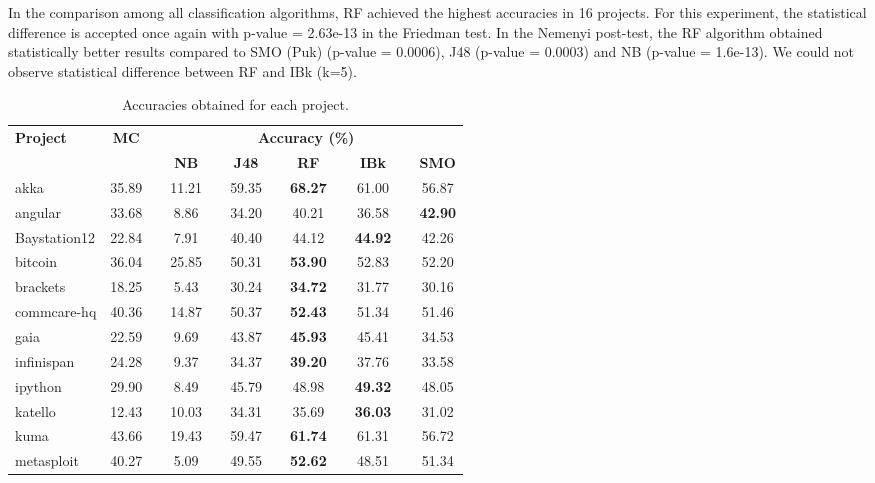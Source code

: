 \documentclass{sig-alternate}
\begin{document}
In the comparison among all classification algorithms, RF achieved the highest accuracies in 16 projects. For this experiment, the statistical difference is accepted once again with p-value = 2.63e-13 in the Friedman test. In the Nemenyi post-test, the RF algorithm obtained statistically better results compared to SMO (Puk) (p-value = 0.0006), J48 (p-value = 0.0003) and NB (p-value = 1.6e-13). We could not observe statistical difference between RF and IBk (k=5).
\begin{table}[t]
\vspace{-0.215cm}
\caption{Accuracies obtained for each project.}\label{tab:Table 3}
\begin{tabular}{@{}lc@{} p{0.12cm} @{}c@{} p{0.12cm} @{}c@{} p{0.12cm} @{}c@{} p{0.12cm} @{}c@{} p{0.12cm} @{}c@{}}
\toprule
\multirow{2}{*}{\textbf{Project}} & \multirow{2}{*}{\textbf{MC}} & \multicolumn{10}{c}{\textbf{Accuracy (\%)}} \\ \cmidrule(l){3-12} 
 &  &  & \textbf{NB} &  & \textbf{J48} &  & \textbf{RF} &  & \textbf{IBk} &  & \textbf{SMO} \\ \midrule
akka & 35.89 &  & 11.21 &  & 59.35 &  & \textbf{68.27} &  & 61.00 &  & 56.87 \\
angular & 33.68 &  & 8.86 &  & 34.20 &  & 40.21 &  & 36.58 &  & \textbf{42.90} \\
Baystation12 & 22.84 &  & 7.91 &  & 40.40 &  & 44.12 &  & \textbf{44.92} &  & 42.26 \\
bitcoin & 36.04 &  & 25.85 &  & 50.31 &  & \textbf{53.90} &  & 52.83 &  & 52.20 \\
brackets & 18.25 &  & 5.43 &  & 30.24 &  & \textbf{34.72} &  & 31.77 &  & 30.16 \\
commcare-hq & 40.36 &  & 14.87 &  & 50.37 &  & \textbf{52.43} &  & 51.34 &  & 51.46 \\
gaia & 22.59 &  & 9.69 &  & 43.87 &  & \textbf{45.93} &  & 45.41 &  & 34.53 \\
infinispan & 24.28 &  & 9.37 &  & 34.37 &  & \textbf{39.20} &  & 37.76 &  & 33.58 \\
ipython & 29.90 &  & 8.49 &  & 45.79 &  & 48.98 &  & \textbf{49.32} &  & 48.05 \\
katello & 12.43 &  & 10.03 &  & 34.31 &  & 35.69 &  & \textbf{36.03} &  & 31.02 \\
kuma & 43.66 &  & 19.43 &  & 59.47 &  & \textbf{61.74} &  & 61.31 &  & 56.72 \\
metasploit & 40.27 &  & 5.09 &  & 49.55 &  & \textbf{52.62} &  & 48.51 &  & 51.34 \\

\end{tabular}
\end{table}
\end{document}
